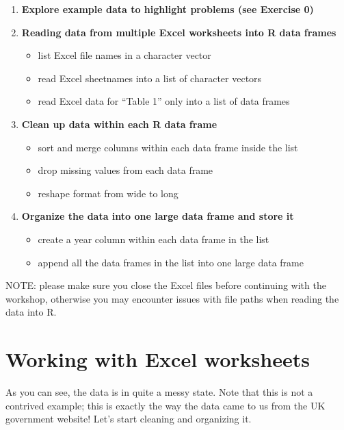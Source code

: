 \documentclass[
]{book}
\providecommand{\tightlist}{%
  \setlength{\itemsep}{0pt}\setlength{\parskip}{0pt}}
\begin{document}
\begin{enumerate}
\def\labelenumi{\arabic{enumi}.}
\setcounter{enumi}{-1}
\item
  \textbf{Explore example data to highlight problems (see Exercise 0)}
\item
  \textbf{Reading data from multiple Excel worksheets into R data frames}

  \begin{itemize}
  \tightlist
  \item
    list Excel file names in a character vector
  \item
    read Excel sheetnames into a list of character vectors
  \item
    read Excel data for ``Table 1'' only into a list of data frames
  \end{itemize}
\item
  \textbf{Clean up data within each R data frame}

  \begin{itemize}
  \tightlist
  \item
    sort and merge columns within each data frame inside the list
  \item
    drop missing values from each data frame
  \item
    reshape format from wide to long
  \end{itemize}
\item
  \textbf{Organize the data into one large data frame and store it}

  \begin{itemize}
  \tightlist
  \item
    create a year column within each data frame in the list
  \item
    append all the data frames in the list into one large data frame
  \end{itemize}
\end{enumerate}

NOTE: please make sure you close the Excel files before continuing with the
workshop, otherwise you may encounter issues with file paths when reading
the data into R.

\hypertarget{working-with-excel-worksheets}{%
\section{Working with Excel worksheets}\label{working-with-excel-worksheets}}

As you can see, the data is in quite a messy state. Note that this is
not a contrived example; this is exactly the way the data came to us
from the UK government website! Let's start cleaning and organizing
it.
\end{document}
